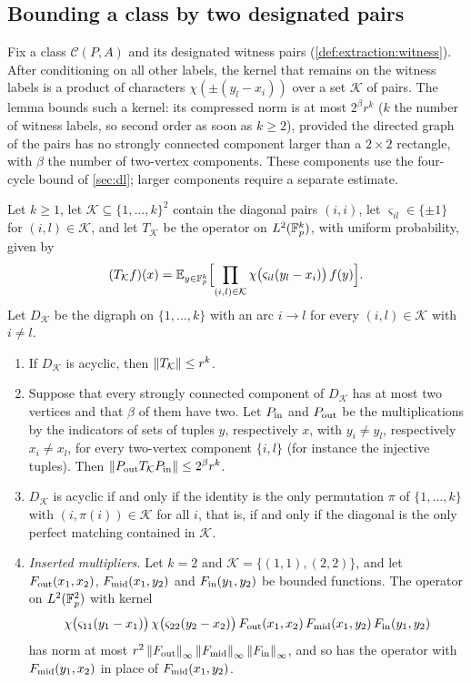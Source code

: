 \subsection{Bounding a class by two designated pairs}\label{subsec:extraction:kernel}

Fix a class $\mathcal C(P,A)$ and its designated witness pairs
(\cref{def:extraction:witness}). After conditioning on all other
labels, the kernel that remains on the witness labels is a product
of characters $\chi(\pm(y_l-x_i))$ over a set $\mathcal K$ of
pairs. The lemma bounds such a kernel: its compressed norm is at most $2^\beta r^k$
($k$ the number of witness labels, so second order as soon as
$k\ge2$), provided the directed graph of the pairs has no strongly
connected component larger than a $2\times2$ rectangle, with $\beta$ the
number of two-vertex components. These components use the four-cycle
bound of \cref{sec:dl}; larger components require a separate estimate.

\begin{lemma}\label{lem:matching:kernel}
Let $k\ge1$, let $\mathcal K\subseteq\{1,\dots,k\}^2$ contain the diagonal pairs
$(i,i)$, let $\varsigma_{il}\in\{\pm1\}$ for $(i,l)\in\mathcal K$, and let
$T_{\mathcal K}$ be the operator on $L^2(\mathbb F_p^k)$, with uniform probability, given
by
\[
 (T_{\mathcal K}f)(x)=\mathbb E_{y\in\mathbb F_p^k}\Bigl[\prod_{(i,l)\in\mathcal K}
 \chi\bigl(\varsigma_{il}(y_l-x_i)\bigr)\,f(y)\Bigr].
\]
Let $D_{\mathcal K}$ be the digraph on $\{1,\dots,k\}$ with an arc $i\to l$ for
every $(i,l)\in\mathcal K$ with $i\ne l$.
\begin{enumerate}[label=\textup{(\alph*)}]
\item If $D_{\mathcal K}$ is acyclic, then $\left\|T_{\mathcal K}\right\|\le r^k$.
\item Suppose that every strongly connected component of $D_{\mathcal K}$ has at
 most two vertices and that $\beta$ of them have two. Let $P_{\rm in}$ and
 $P_{\rm out}$ be the multiplications by the indicators of sets of tuples $y$,
 respectively $x$, with $y_i\ne y_l$, respectively $x_i\ne x_l$, for every
 two-vertex component $\{i,l\}$ (for instance the injective tuples). Then
 $\left\|P_{\rm out}T_{\mathcal K}P_{\rm in}\right\|\le2^\beta r^k$.
\item $D_{\mathcal K}$ is acyclic if and only if the identity is the only
 permutation $\pi$ of $\{1,\dots,k\}$ with $(i,\pi(i))\in\mathcal K$ for
 all $i$, that is, if and only if the diagonal is the only perfect matching
 contained in $\mathcal K$.
\item \emph{Inserted multipliers.} Let $k=2$ and $\mathcal K=\{(1,1),(2,2)\}$, and
 let $F_{\rm out}(x_1,x_2)$, $F_{\rm mid}(x_1,y_2)$ and $F_{\rm in}(y_1,y_2)$ be
 bounded functions. The operator on $L^2(\mathbb F_p^2)$ with kernel
 \[
  \chi\bigl(\varsigma_{11}(y_1-x_1)\bigr)\,\chi\bigl(\varsigma_{22}(y_2-x_2)\bigr)\,
  F_{\rm out}(x_1,x_2)\,F_{\rm mid}(x_1,y_2)\,F_{\rm in}(y_1,y_2)
 \]
 has norm at most $r^2\left\|F_{\rm out}\right\|_\infty\left\|F_{\rm mid}\right\|_\infty
 \left\|F_{\rm in}\right\|_\infty$, and so has the operator with $F_{\rm mid}(y_1,x_2)$ in
 place of $F_{\rm mid}(x_1,y_2)$.
\end{enumerate}
\end{lemma}

